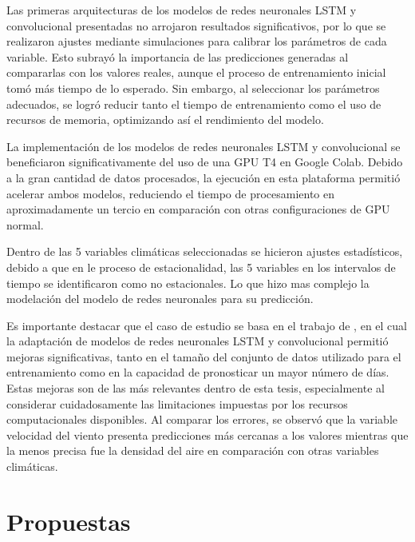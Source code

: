 \documentclass[
  us-letterpaper,
]{scrreprt}
\theoremstyle{plain}
\theoremstyle{definition}
\theoremstyle{definition}
\theoremstyle{remark}
\begin{document}
Las primeras arquitecturas de los modelos de redes neuronales LSTM y
convolucional presentadas no arrojaron resultados significativos, por lo
que se realizaron ajustes mediante simulaciones para calibrar los
parámetros de cada variable. Esto subrayó la importancia de las
predicciones generadas al compararlas con los valores reales, aunque el
proceso de entrenamiento inicial tomó más tiempo de lo esperado. Sin
embargo, al seleccionar los parámetros adecuados, se logró reducir tanto
el tiempo de entrenamiento como el uso de recursos de memoria,
optimizando así el rendimiento del modelo.

La implementación de los modelos de redes neuronales LSTM y
convolucional se beneficiaron significativamente del uso de una GPU T4
en Google Colab. Debido a la gran cantidad de datos procesados, la
ejecución en esta plataforma permitió acelerar ambos modelos, reduciendo
el tiempo de procesamiento en aproximadamente un tercio en comparación
con otras configuraciones de GPU normal.

Dentro de las 5 variables climáticas seleccionadas se hicieron ajustes
estadísticos, debido a que en le proceso de estacionalidad, las 5
variables en los intervalos de tiempo se identificaron como no
estacionales. Lo que hizo mas complejo la modelación del modelo de redes
neuronales para su predicción.

Es importante destacar que el caso de estudio se basa en el trabajo de
\autocite{fierro2021prediccion}, en el cual la adaptación de modelos de
redes neuronales LSTM y convolucional permitió mejoras significativas,
tanto en el tamaño del conjunto de datos utilizado para el entrenamiento
como en la capacidad de pronosticar un mayor número de días. Estas
mejoras son de las más relevantes dentro de esta tesis, especialmente al
considerar cuidadosamente las limitaciones impuestas por los recursos
computacionales disponibles. Al comparar los errores, se observó que la
variable velocidad del viento presenta predicciones más cercanas a los
valores mientras que la menos precisa fue la densidad del aire en
comparación con otras variables climáticas.


\chapter*{Propuestas}\label{propuestas}

\end{document}
